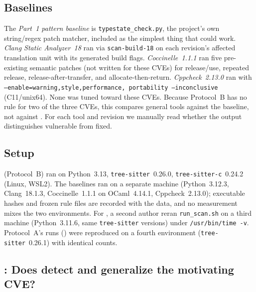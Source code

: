 \subsection{Baselines}
\label{sec:baselines}
The \emph{Part~1 pattern baseline} is \texttt{typestate\_check.py}, the
project's own string/regex patch matcher, included as the simplest thing
that could work. \emph{Clang Static Analyzer~18} ran via
\texttt{scan-build-18} on each revision's affected translation unit with its
generated build flags. \emph{Coccinelle~1.1.1} ran five pre-existing
semantic patches (not written for these CVEs) for release/use, repeated
release, release-after-transfer, and allocate-then-return.
\emph{Cppcheck~2.13.0} ran with \texttt{--enable=warning,style,performance,
portability --inconclusive} (C11/unix64). None was tuned toward these
CVEs. Because Protocol~B has no rule for two of the three CVEs, this
compares general tools against the baseline, not against \tool. For each
tool and revision we manually read whether the output distinguishes
vulnerable from fixed.

\subsection{Setup}
\label{sec:setup}
\tool (Protocol~B) ran on Python~3.13, \texttt{tree-sitter}~0.26.0,
\texttt{tree-sitter-c}~0.24.2 (Linux, WSL2). The  baselines ran on
a separate machine (Python~3.12.3, Clang~18.1.3, Coccinelle~1.1.1 on
OCaml~4.14.1, Cppcheck~2.13.0); executable hashes and frozen rule files are
recorded with the data, and no measurement mixes the two environments. For
, a second author reran \texttt{run\_scan.sh} on a third machine
(Python~3.11.6, same \texttt{tree-sitter} versions) under
\texttt{/usr/bin/time -v}. Protocol~A's runs () were reproduced on
a fourth environment (\texttt{tree-sitter}~0.26.1) with identical counts.

\subsection{: Does \tool detect and generalize the motivating CVE?}
\label{sec:rq1}

